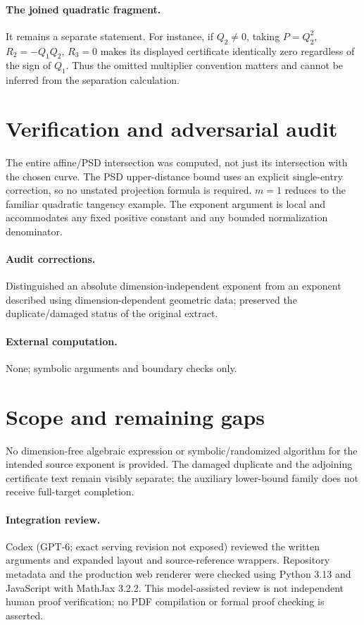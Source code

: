 \documentclass[11pt]{article}
\begin{document}
\paragraph{The joined quadratic fragment.}
It remains a separate statement. For instance, if $Q_2\ne0$, taking $P=Q_2^2$, $R_2=-Q_1Q_2$, $R_3=0$ makes its displayed certificate identically zero regardless of the sign of $Q_1$. Thus the omitted multiplier convention matters and cannot be inferred from the separation calculation.
\section{Verification and adversarial audit}
The entire affine/PSD intersection was computed, not just its intersection with the chosen curve. The PSD upper-distance bound uses an explicit single-entry correction, so no unstated projection formula is required. $m=1$ reduces to the familiar quadratic tangency example. The exponent argument is local and accommodates any fixed positive constant and any bounded normalization denominator.
\paragraph{Audit corrections.} Distinguished an absolute dimension-independent exponent from an exponent described using dimension-dependent geometric data; preserved the duplicate/damaged status of the original extract.
\paragraph{External computation.} None; symbolic arguments and boundary checks only.
\section{Scope and remaining gaps}
No dimension-free algebraic expression or symbolic/randomized algorithm for the intended source exponent is provided. The damaged duplicate and the adjoining certificate text remain visibly separate; the auxiliary lower-bound family does not receive full-target completion.
\paragraph{Integration review.} Codex (GPT-6; exact serving revision not exposed) reviewed the written arguments and expanded layout and source-reference wrappers. Repository metadata and the production web renderer were checked using Python 3.13 and JavaScript with MathJax 3.2.2. This model-assisted review is not independent human proof verification; no PDF compilation or formal proof checking is asserted.
\end{document}
